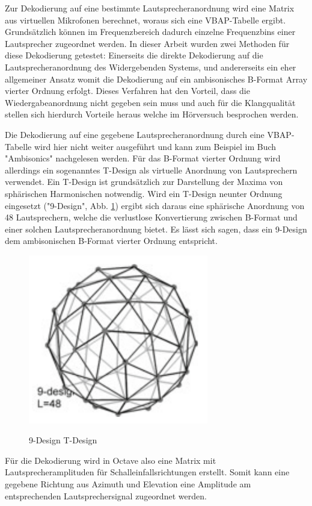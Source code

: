 Zur Dekodierung auf eine bestimmte Lautsprecheranordnung wird eine Matrix aus virtuellen Mikrofonen berechnet, woraus sich eine VBAP-Tabelle ergibt. Grundsätzlich können im Frequenzbereich dadurch einzelne Frequenzbins einer Lautsprecher zugeordnet werden. In dieser Arbeit wurden zwei Methoden für diese Dekodierung getestet: Einerseits die direkte Dekodierung auf die Lautsprecheranordnung des Widergebenden Systems, und andererseits ein eher allgemeiner Ansatz womit die Dekodierung auf ein ambisonisches B-Format Array vierter Ordnung erfolgt. Dieses Verfahren hat den Vorteil, dass die Wiedergabeanordnung nicht gegeben sein muss und auch für die Klangqualität stellen sich hierdurch Vorteile heraus welche im Hörversuch besprochen werden.

Die Dekodierung auf eine gegebene Lautsprecheranordnung durch eine VBAP-Tabelle wird hier nicht weiter ausgeführt und kann zum Beispiel im Buch "Ambisonics" nachgelesen werden. Für das B-Format vierter Ordnung wird allerdings ein sogenanntes T-Design als virtuelle Anordnung von Lautsprechern verwendet. Ein T-Design ist grundsätzlich zur Darstellung der Maxima von sphärischen Harmonischen notwendig. Wird ein T-Design neunter Ordnung eingesetzt ("9-Design", Abb. \ref{fig:tdesign}) ergibt sich daraus eine sphärische Anordnung von 48 Lautsprechern, welche die verlustlose Konvertierung zwischen B-Format und einer solchen Lautsprecheranordnung bietet. Es lässt sich sagen, dass ein 9-Design dem ambisonischen B-Format vierter Ordnung entspricht.

\begin{figure}[!ht]
  \centering
  \includegraphics[width=0.7\textwidth]{implementierung/plots/t-design.png}
  \label{fig:tdesign}
  \caption{9-Design T-Design}
\end{figure}

Für die Dekodierung wird in Octave also eine Matrix mit Lautsprecheramplituden für Schalleinfallsrichtungen erstellt. Somit kann eine gegebene Richtung aus Azimuth und Elevation eine Amplitude am entsprechenden Lautsprechersignal zugeordnet werden.
